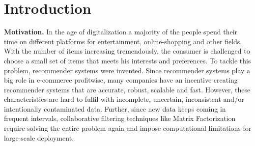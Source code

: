 \documentclass[letterpaper]{article}
\newcommand{\mypar}[1]{{\bf #1.}}
\begin{document}
\section{Introduction}\label{sec:intro}

\mypar{Motivation}
In the age of digitalization a majority of the people spend their time on different platforms for entertainment, online-shopping and other fields. With the number of items increasing tremendously, the consumer is challenged to choose a small set of items that meets his interests and preferences. To tackle this problem, recommender systems were invented. Since recommender systems play a big role in e-commerce profitwise, many companies have an incentive creating recommender systems that are accurate, robust, scalable and fast. However, these characteristics are hard to fulfil with incomplete, uncertain, inconsistent and/or intentionally contaminated data. Further, since new data keeps coming in frequent intervals, collaborative filtering techniques like Matrix Factorization require solving the entire problem again and impose computational limitations for large-scale deployment.
\end{document}
